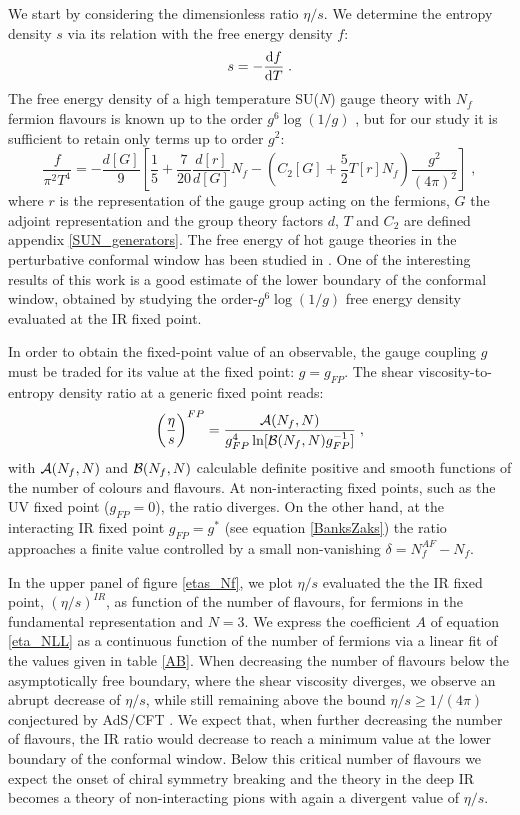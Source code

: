 We start by considering the dimensionless ratio $\eta/s$. We determine the entropy density $s$ via its relation with the free energy density $f$: 
\begin{equation}
s = - \frac{\mathrm{d} f}{\mathrm{d} T}  \; . 
\end{equation}
%
The free energy density of a high temperature SU($N$) gauge theory with $N_f$ fermion flavours is known up to the order $g^6 \log(1/g)$ \cite{Kajantie:2002wa}, but for our study it is sufficient to retain only terms up to order $g^2$:
\begin{equation}
\frac{f}{\pi^2 T^4 } = - \frac{d[G]}{9} \left[ \frac{1}{5} + \frac{7}{20}\frac{d[r]}{d[G]}N_f 
-   \left ( C_2[G] + \frac{5}{2}T[r] N_f \right ) \frac{g^2}{(4\pi)^2} \right ]\; ,
\end{equation}
%
where $r$ is the representation of the gauge group acting on the fermions, $G$ the adjoint representation and the group theory factors $d$, $T$ and $C_2$ are defined appendix \ref{SUN_generators}.
The free energy of hot gauge theories in the perturbative conformal window has been studied in \cite{Mojaza:2010cm}. One of the interesting results of this work is a good estimate of the lower boundary of the conformal window, obtained by studying the order-$g^6 \log(1/g)$ free energy density evaluated at the IR fixed point.

In order to obtain the fixed-point value of an observable, the gauge coupling $g$ must be traded for its value at the fixed point: $g=g_{FP}$. The shear viscosity-to-entropy density ratio at a generic fixed point reads:
\begin{equation}
\biggl( \frac{\eta}{s} \biggr)^{FP} = \frac{{\cal A}(N_ f, N) }{g_{FP}^4 \ln[{\cal B}(N_f, N)g_{FP}^{-1}]}  \; , 
\label{etaoversFP}
\end{equation}
%
with $ {\cal A}(N_f, N) $  and $ {\cal B}(N_f, N) $ calculable definite positive and smooth functions of the number of 
colours and flavours.  At non-interacting fixed points,  such as the UV fixed point ($g_{FP} = 0$), the ratio diverges. On the  other hand, at the interacting IR fixed point $g_{FP} = g^*$ (see equation \ref{BanksZaks}) the ratio approaches a finite value controlled by a small non-vanishing $\delta = N_f^{AF} - N_f $. 
 
In the upper panel of figure \ref{etas_Nf}, we plot $\eta/s$ evaluated the the IR fixed point, $(\eta/s)^{IR}$, as function of the number of flavours, for fermions in the fundamental representation and $N = 3$. We express the coefficient $A$ of equation \ref{eta_NLL} as a continuous function of the number of fermions via a linear fit of the values given in table \ref{AB}. When decreasing the number of flavours below the asymptotically free boundary, where the shear viscosity diverges, we observe an abrupt decrease of $\eta/s$, while still remaining above the bound $\eta/s \geq 1/(4\pi)$ conjectured by AdS/CFT \cite{Kovtun:2004de}. We expect that, when further decreasing the number of flavours, the IR ratio would decrease to reach a minimum value at the lower boundary of the conformal window. Below this critical number of flavours we expect the onset of chiral symmetry breaking and the theory in the deep IR becomes a theory of non-interacting pions with again a divergent value of $\eta/s$.

